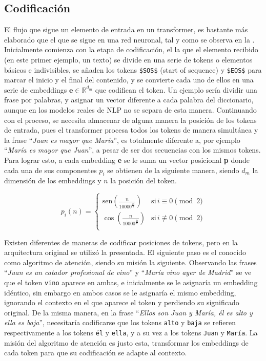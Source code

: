 			\subsection{Codificación}
			
				El flujo que sigue un elemento de entrada en un transformer, es bastante más elaborado que el que se sigue en una red neuronal, tal y como se observa en la . Inicialmente comienza con la etapa de codificación, el la que el elemento recibido (en este primer ejemplo, un texto) se divide en una serie de tokens o elementos básicos e indivisibles, se añaden los tokens \texttt{\$SOS\$} (start of sequence) y \texttt{\$EOS\$} para marcar el inicio y el final del contenido, y se convierte cada uno de ellos en una serie de embeddings $\textbf{e} \in \mathbb{R}^{d_m}$ que codifican el token. Un ejemplo sería dividir una frase por palabras, y asignar un vector diferente a cada palabra del diccionario, aunque en los modelos reales de NLP no se separa de esta manera. Continuando con el proceso, se necesita almacenar de alguna manera la posición de los tokens de entrada, pues el transformer procesa todos los tokens de manera simultánea y la frase ``\textit{Juan es mayor que María}'', es totalmente diferente a, por ejemplo ``\textit{María es mayor que Juan}'', a pesar de ser dos secuencias con los mismos tokens. Para lograr esto, a cada embedding \textbf{e} se le suma un vector posicional \textbf{p} donde cada una de sus componentes $p_i$ se obtienen de la siguiente manera, siendo $d_m$ la dimensión de los embeddings y $n$ la posición del token. 
				
				$$
				p_i(n) = \begin{cases}
					\text{sen}\left(\frac{n}{10000^{\frac{2i}{d}}}\right) & \text{si}\, i \equiv 0 \pmod{2}\\
					\cos\left(\frac{n}{10000^{\frac{2i}{d}}}\right) & \text{si}\, i \not\equiv 0 \pmod{2}\\
					\end{cases}
				$$
				
				Existen diferentes de maneras de codificar posiciones de tokens, pero en la arquitectura original se utilizó la presentada. El siguiente paso es el conocido como algoritmo de atención, siendo su misión la siguiente. Observando las frases ``\textit{Juan es un catador profesional de vino}'' y ``\textit{María vino ayer de Madrid}'' se ve que el token \texttt{vino} aparece en ambas, e inicialmente se le asignaría un embedding idéntico, sin embargo en ambos casos se le asignaría el mismo embedding, ignorando el contexto en el que aparece el token y perdiendo su significado original. De la misma manera, en la frase ``\textit{Ellos son Juan y María, él es alto y ella es baja}'', necesitaría codificarse que los tokens \texttt{alto} y \texttt{baja} se refieren respectivamente a los tokens \texttt{él} y \texttt{ella}, y a su vez a los tokens \texttt{Juan} y \texttt{María}. La misión del algoritmo de atención es justo esta, transformar los embeddings de cada token para que su codificación se adapte al contexto. \\
				
